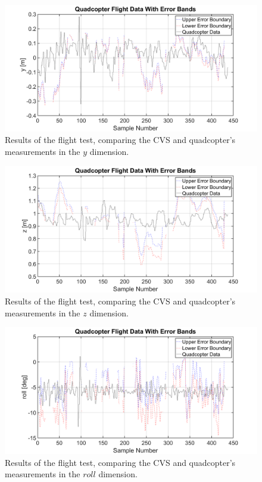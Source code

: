 \begin{figure}
  \centering
  \includegraphics[clip, trim = 80 0 100 0, width = \textwidth]{figures/chapter5/ts_y}
  \caption{Results of the flight test, comparing the CVS and quadcopter's measurements in the $y$ dimension.}
\end{figure}

\begin{figure}
  \centering
  \includegraphics[clip, trim = 80 0 100 0, width = \textwidth]{figures/chapter5/ts_z}
  \caption{Results of the flight test, comparing the CVS and quadcopter's measurements in the $z$ dimension.}
\end{figure}

\begin{figure}
  \centering
  \includegraphics[clip, trim = 80 0 100 0, width = \textwidth]{figures/chapter5/ts_roll}
  \caption{Results of the flight test, comparing the CVS and quadcopter's measurements in the $roll$ dimension.}
\end{figure}

